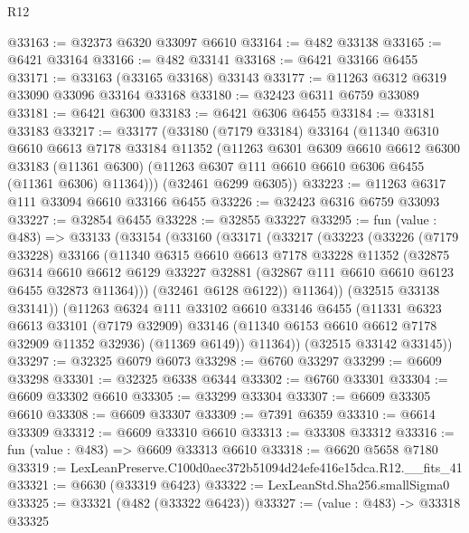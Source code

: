 \begin{lexlean}{R12}
\begin{coremodule}
@33163 := @32373 @6320 @33097 @6610
@33164 := @482 @33138
@33165 := @6421 @33164
@33166 := @482 @33141
@33168 := @6421 @33166 @6455
@33171 := @33163 (@33165 @33168) @33143
@33177 := @11263 @6312 @6319 @33090 @33096 @33164 @33168
@33180 := @32423 @6311 @6759 @33089
@33181 := @6421 @6300
@33183 := @6421 @6306 @6455
@33184 := @33181 @33183
@33217 := @33177
    (@33180
      (@7179 @33184)
      @33164
      (@11340
        @6310
        @6610
        @6613
        @7178
        @33184
        @11352
        (@11263
          @6301
          @6309
          @6610
          @6612
          @6300
          @33183
          (@11361 @6300)
          (@11263 @6307 @111 @6610 @6610 @6306 @6455 (@11361 @6306) @11364)))
      (@32461 @6299 @6305))
@33223 := @11263 @6317 @111 @33094 @6610 @33166 @6455
@33226 := @32423 @6316 @6759 @33093
@33227 := @32854 @6455
@33228 := @32855 @33227
@33295 := fun (value : @483) =>
  @33133
    (@33154
      (@33160
        (@33171
          (@33217
            (@33223
              (@33226
                (@7179 @33228)
                @33166
                (@11340
                  @6315
                  @6610
                  @6613
                  @7178
                  @33228
                  @11352
                  (@32875
                    @6314
                    @6610
                    @6612
                    @6129
                    @33227
                    @32881
                    (@32867 @111 @6610 @6610 @6123 @6455 @32873 @11364)))
                (@32461 @6128 @6122))
              @11364))
          (@32515 @33138 @33141))
        (@11263
          @6324
          @111
          @33102
          @6610
          @33146
          @6455
          (@11331
            @6323
            @6613
            @33101
            (@7179 @32909)
            @33146
            (@11340 @6153 @6610 @6612 @7178 @32909 @11352 @32936)
            (@11369 @6149))
          @11364))
      (@32515 @33142 @33145))
@33297 := @32325 @6079 @6073
@33298 := @6760 @33297
@33299 := @6609 @33298
@33301 := @32325 @6338 @6344
@33302 := @6760 @33301
@33304 := @6609 @33302 @6610
@33305 := @33299 @33304
@33307 := @6609 @33305 @6610
@33308 := @6609 @33307
@33309 := @7391 @6359
@33310 := @6614 @33309
@33312 := @6609 @33310 @6610
@33313 := @33308 @33312
@33316 := fun (value : @483) => @6609 @33313 @6610
@33318 := @6620 @5658 @7180
@33319 := LexLeanPreserve.C100d0aec372b51094d24efe416e15dca.R12.__fits_41
@33321 := @6630 (@33319 @6423)
@33322 := LexLeanStd.Sha256.smallSigma0
@33325 := @33321 (@482 (@33322 @6423))
@33327 := (value : @483) -> @33318 @33325

\end{coremodule}
\end{lexlean}

